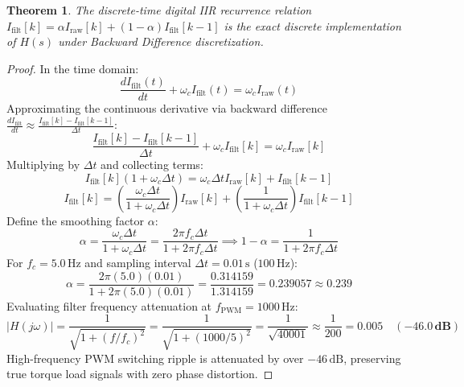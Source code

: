 \documentclass[11pt, a4paper]{article}
\newtheorem{theorem}{Theorem}[section]
\begin{document}
\begin{theorem}
The discrete-time digital IIR recurrence relation $I_{\text{filt}}[k] = \alpha I_{\text{raw}}[k] + (1 - \alpha) I_{\text{filt}}[k-1]$ is the exact discrete implementation of $H(s)$ under Backward Difference discretization.
\end{theorem}

\begin{proof}
In the time domain:
\begin{equation}
    \frac{d I_{\text{filt}}(t)}{dt} + \omega_c I_{\text{filt}}(t) = \omega_c I_{\text{raw}}(t)
\end{equation}
Approximating the continuous derivative via backward difference $\frac{d I_{\text{filt}}}{dt} \approx \frac{I_{\text{filt}}[k] - I_{\text{filt}}[k-1]}{\Delta t}$:
\begin{equation}
    \frac{I_{\text{filt}}[k] - I_{\text{filt}}[k-1]}{\Delta t} + \omega_c I_{\text{filt}}[k] = \omega_c I_{\text{raw}}[k]
\end{equation}
Multiplying by $\Delta t$ and collecting terms:
\begin{equation}
    I_{\text{filt}}[k](1 + \omega_c \Delta t) = \omega_c \Delta t I_{\text{raw}}[k] + I_{\text{filt}}[k-1]
\end{equation}
\begin{equation}
    I_{\text{filt}}[k] = \left(\frac{\omega_c \Delta t}{1 + \omega_c \Delta t}\right) I_{\text{raw}}[k] + \left(\frac{1}{1 + \omega_c \Delta t}\right) I_{\text{filt}}[k-1]
\end{equation}
Define the smoothing factor $\alpha$:
\begin{equation}
    \alpha = \frac{\omega_c \Delta t}{1 + \omega_c \Delta t} = \frac{2\pi f_c \Delta t}{1 + 2\pi f_c \Delta t} \implies 1 - \alpha = \frac{1}{1 + 2\pi f_c \Delta t}
\end{equation}
For $f_c = 5.0\,\text{Hz}$ and sampling interval $\Delta t = 0.01\,\text{s}$ ($100\,\text{Hz}$):
\begin{equation}
    \alpha = \frac{2\pi(5.0)(0.01)}{1 + 2\pi(5.0)(0.01)} = \frac{0.314159}{1.314159} = \mathbf{0.239057} \approx \mathbf{0.239}
\end{equation}
Evaluating filter frequency attenuation at $f_{\text{PWM}} = 1000\,\text{Hz}$:
\begin{equation}
    |H(j\omega)| = \frac{1}{\sqrt{1 + (f / f_c)^2}} = \frac{1}{\sqrt{1 + (1000 / 5)^2}} = \frac{1}{\sqrt{40001}} \approx \frac{1}{200} = \mathbf{0.005} \quad (\mathbf{-46.0\,\text{dB}})
\end{equation}
High-frequency PWM switching ripple is attenuated by over $-46\,\text{dB}$, preserving true torque load signals with zero phase distortion.
\end{proof}
\end{document}
